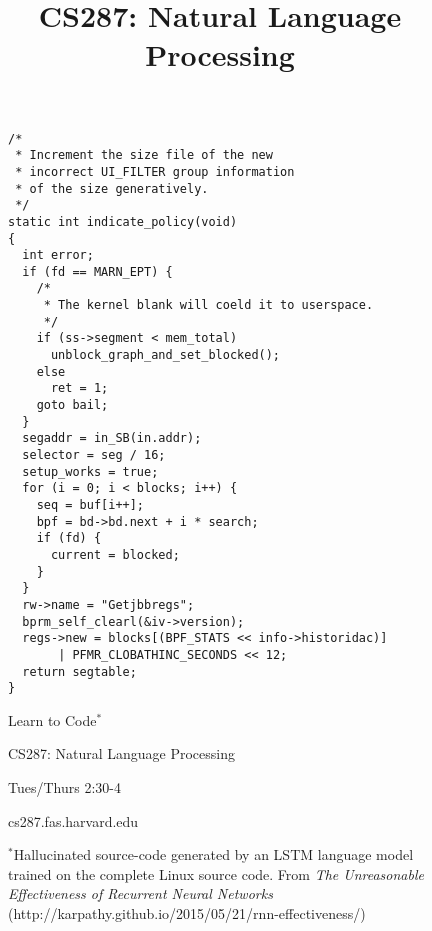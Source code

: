 \documentclass{article}
\title{CS287: Natural Language Processing}
\date{}
\begin{document}
\begin{figure}[c!]
  \centering
{}

\begin{lstlisting}
/*
 * Increment the size file of the new 
 * incorrect UI_FILTER group information
 * of the size generatively.
 */
static int indicate_policy(void)
{
  int error;
  if (fd == MARN_EPT) {
    /*
     * The kernel blank will coeld it to userspace.
     */
    if (ss->segment < mem_total)
      unblock_graph_and_set_blocked();
    else
      ret = 1;
    goto bail;
  }
  segaddr = in_SB(in.addr);
  selector = seg / 16;
  setup_works = true;
  for (i = 0; i < blocks; i++) {
    seq = buf[i++];
    bpf = bd->bd.next + i * search;
    if (fd) {
      current = blocked;
    }
  }
  rw->name = "Getjbbregs";
  bprm_self_clearl(&iv->version);
  regs->new = blocks[(BPF_STATS << info->historidac)] 
       | PFMR_CLOBATHINC_SECONDS << 12;
  return segtable;
}
\end{lstlisting}

\vspace{1cm}
\begin{center}
\begin{center}
  {\huge Learn to Code$^*$}
\end{center}
\vspace{1cm}

 {\LARGE CS287: Natural Language Processing}

 {\LARGE Tues/Thurs 2:30-4}
 \vspace{0.25cm}

 {\LARGE cs287.fas.harvard.edu}

\end{center}
\vspace{2cm}
{\footnotesize $^*$Hallucinated source-code generated by an LSTM language model trained on the complete Linux source code. From \textit{The Unreasonable Effectiveness of Recurrent Neural Networks}  (http://karpathy.github.io/2015/05/21/rnn-effectiveness/)}
\end{figure}
\end{document}

